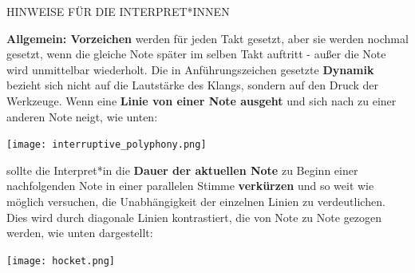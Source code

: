 \documentclass[12pt]{article}
\newcommand*\circled[1]{\tikz[baseline=(char.base)]{
            \node[shape=circle,draw,inner sep=1pt] (char) {#1};}}
\begin{document}
\begingroup
\begin{center}
\huge HINWEISE FÜR DIE INTERPRET*INNEN
\end{center}
\endgroup

\begingroup
\textbf{Allgemein: \circled{1} Vorzeichen} werden für jeden Takt gesetzt, aber sie werden nochmal gesetzt, wenn die gleiche Note später im selben Takt auftritt - außer die Note wird unmittelbar wiederholt. \textbf{\circled{2}} Die in Anführungszeichen gesetzte \textbf{Dynamik} bezieht sich nicht auf die Lautstärke des Klangs, sondern auf den Druck der Werkzeuge. \textbf{\circled{3}} Wenn eine \textbf{Linie von einer Note ausgeht} und sich nach zu einer anderen Note neigt, wie unten: 

\begin{center}
\texttt{[image: interruptive\_polyphony.png]}
\end{center}

sollte die Interpret*in die \textbf{Dauer der aktuellen Note} zu Beginn einer nachfolgenden Note in einer parallelen Stimme \textbf{verkürzen} und so weit wie möglich versuchen, die Unabhängigkeit der einzelnen Linien zu verdeutlichen. Dies wird durch diagonale Linien kontrastiert, die von Note zu Note gezogen werden, wie unten dargestellt: 

\begin{center}
\texttt{[image: hocket.png]}
\end{center}
\end{document}
